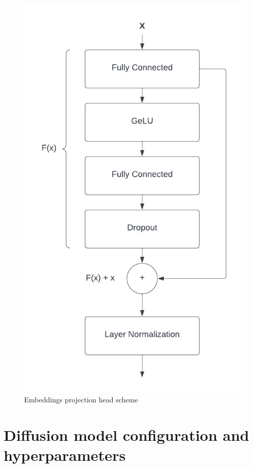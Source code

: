 \documentclass[runningheads]{llncs}
\begin{document}
\begin{figure}[H]
    \centering
    \includegraphics[scale=0.3]{img/Residual layer.png}
    \caption{Embeddings projection head scheme}   %
    \label{img:projection_head}
\end{figure}

\section{Diffusion model configuration and hyperparameters}
\label{app:diffuser_config}
\end{document}
